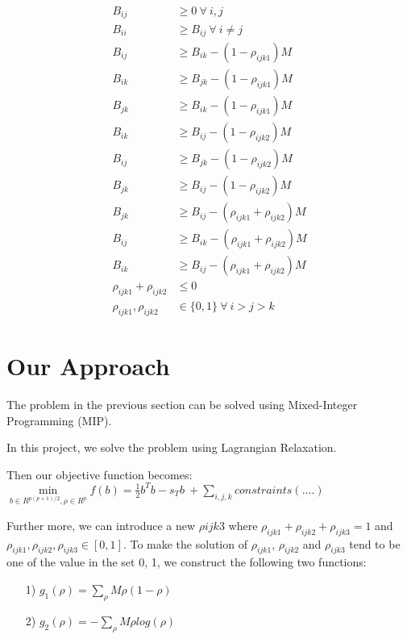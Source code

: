 \begin{align}
B_{ij} & \ge 0 ~ \forall ~ i, j \\
B_{ii} & \ge B_{ij} ~ \forall ~ i \not= j\\
B_{ij} & \ge B_{ik} - (1 - \rho_{ijk1})M \\
B_{ik} & \ge B_{jk} - (1 - \rho_{ijk1})M \\
B_{jk} & \ge B_{ik} - (1 - \rho_{ijk1})M \\
B_{ik} & \ge B_{ij} - (1 - \rho_{ijk2})M \\
B_{ij} & \ge B_{jk} - (1 - \rho_{ijk2})M \\
B_{jk} & \ge B_{ij} - (1 - \rho_{ijk2})M \\
B_{jk} & \ge B_{ij} - (\rho_{ijk1} + \rho_{ijk2})M \\
B_{ij} & \ge B_{ik} - (\rho_{ijk1} + \rho_{ijk2})M \\
B_{ik} & \ge B_{ij} - (\rho_{ijk1} + \rho_{ijk2})M \\
\rho_{ijk1} + \rho_{ijk2} & \le 0\\
\rho_{ijk1}, \rho_{ijk2} & \in \{0, 1\} ~ \forall ~i > j > k
\end{align}



\section{Our Approach}

The problem in the previous section can be solved using Mixed-Integer Programming (MIP).

In this project, we solve the problem using Lagrangian Relaxation.

Then our objective function becomes:
$\min \limits_{b \in R^{p(p+1)/2}, \rho \in R^{\overline{p}}} f(b) = \frac{1}{2}b^Tb - s_Tb ~+ \sum \limits_{i, j, k} constraints(....)$

Further more, we can introduce a new $\rho{ijk3}$ where $\rho_{ijk1} + \rho_{ijk2} + \rho_{ijk3} = 1$ and $\rho_{ijk1}, \rho_{ijk2}, \rho_{ijk3} \in [0, 1]$.
To make the solution of $\rho_{ijk1}$, $\rho_{ijk2}$ and $\rho_{ijk3}$ tend to be one of the value in the set {0, 1}, we construct the following two functions:
\begin{itemize}
\item[1)] $g_1(\rho) = \sum \limits_{\rho} M \rho (1 - \rho)$
\item[2)] $g_2(\rho) = - \sum \limits_{\rho} M \rho log(\rho)$
\end{itemize} 

